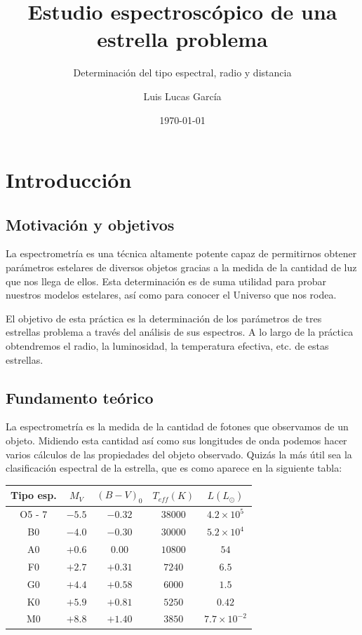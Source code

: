 \documentclass{aa} %
\title{Estudio espectroscópico de una estrella problema}
\subtitle{Determinación del tipo espectral, radio y distancia}
\author{Luis Lucas García}
\institute{Universidad de Alicante}
\date{\today}
\begin{document}
\maketitle
\tableofcontents

\section{Introducción}

\subsection{Motivación y objetivos}

La espectrometría es una técnica altamente potente capaz de permitirnos obtener parámetros estelares de diversos objetos gracias a la medida de la cantidad de luz que nos llega de ellos. Esta determinación es de suma utilidad para probar nuestros modelos estelares, así como para conocer el Universo que nos rodea.

El objetivo de esta práctica es la determinación de los parámetros de tres estrellas problema a través del análisis de sus espectros. A lo largo de la práctica obtendremos el radio, la luminosidad, la temperatura efectiva, etc. de estas estrellas.

\subsection{Fundamento teórico}

La espectrometría es la medida de la cantidad de fotones que observamos de un objeto. Midiendo esta cantidad así como sus longitudes de onda podemos hacer varios cálculos de las propiedades del objeto observado. Quizás la más útil sea la clasificación espectral de la estrella, que es como aparece en la siguiente tabla: \cite{handbook}

\begin{center}
\begin{tabular}{ccccc}
\hline \hline
Tipo esp. & $M_V$ & $(B-V)_0$ & $T_{eff} (K)$ & $L (L_{\odot})$ \\ \hline
O5 - 7 & $-5.5$ & $-0.32$ & $38000$ & $4.2 \times 10^5$ \\
B0 & $-4.0$ & $-0.30$ & $30000$ & $5.2 \times 10^4$ \\
A0 & $+0.6$ & $0.00$ & $10800$ & $54$ \\
F0 & $+2.7$ & $+0.31$ & $7240$ & $6.5$ \\
G0 & $+4.4$ & $+0.58$ & $6000$ & $1.5$ \\
K0 & $+5.9$ & $+0.81$ & $5250$ & $0.42$ \\
M0 & $+8.8$ & $+1.40$ & $3850$ & $7.7 \times 10^{-2}$ \\ \hline \hline
\end{tabular}
\label{table:spectral}
\end{center}
\end{document}
